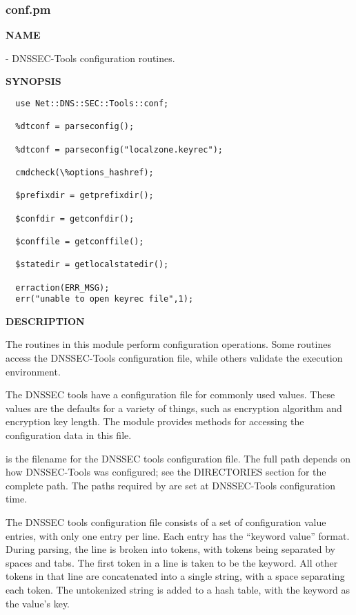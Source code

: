\clearpage

\subsubsection{conf.pm}

{\bf NAME}

 - DNSSEC-Tools configuration routines.

{\bf SYNOPSIS}

\begin{verbatim}
  use Net::DNS::SEC::Tools::conf;

  %dtconf = parseconfig();

  %dtconf = parseconfig("localzone.keyrec");

  cmdcheck(\%options_hashref);

  $prefixdir = getprefixdir();

  $confdir = getconfdir();

  $conffile = getconffile();

  $statedir = getlocalstatedir();

  erraction(ERR_MSG);
  err("unable to open keyrec file",1);
\end{verbatim}

{\bf DESCRIPTION}

The routines in this module perform configuration operations.  Some routines
access the DNSSEC-Tools configuration file, while others validate the
execution environment.

The DNSSEC tools have a configuration file for commonly used values.  These
values are the defaults for a variety of things, such as encryption algorithm
and encryption key length.  The  module
provides methods for accessing the configuration data in this file.

 is the filename for the DNSSEC tools configuration
file.  The full path depends on how DNSSEC-Tools was configured; see the
DIRECTORIES section for the complete path.  The paths required by
 are set at DNSSEC-Tools configuration time.

The DNSSEC tools configuration file consists of a set of configuration value
entries, with only one entry per line.  Each entry has the ``keyword value''
format.  During parsing, the line is broken into tokens, with tokens being
separated by spaces and tabs.  The first token in a line is taken to be the
keyword.  All other tokens in that line are concatenated into a single string,
with a space separating each token.  The untokenized string is added to a hash
table, with the keyword as the value's key.

